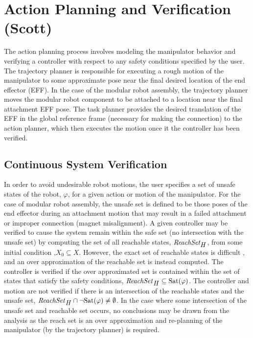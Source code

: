 \section{Action Planning and Verification (Scott)}

The action planning process involves modeling the manipulator behavior and verifying a controller with respect to any safety conditions specified by the user.
The trajectory planner is responsible for executing a rough motion of the manipulator to some approximate pose near the final desired location of the end effector (EFF).
In the case of the modular robot assembly, the trajectory planner moves the modular robot component to be attached to a location near the final attachment EFF pose.
The task planner provides the desired translation of the EFF in the global reference frame (necessary for making the connection) to the action planner, which then executes the motion once it the controller has been verified.


\subsection{Continuous System Verification}
In order to avoid undesirable robot motions, the user specifies a set of unsafe states of the robot, $\varphi$, for a given action or motion of the manipulator.
For the case of modular robot assembly, the unsafe set is defined to be those poses of the end effector during an attachment motion that may result in a failed attachment or improper connection (magnet misalignment).
A given controller may be verified to cause the system remain within the safe set (no intersection with the unsafe set) by computing the set of all reachable states, $\textit{ReachSet}_{\mbox{\textit{H}}}$, from some initial condition ,$X_0 \subseteq X$.
However, the exact set of reachable states is difficult \cite{Henzinger:1995:WDH:225058.225162}, and an over approximation of the reachable set is instead computed.
The controller is verified if the over approximated set is contained within the set of states that satisfy the safety conditions, $\mbox{\textit{ReachSet}}_{\mbox{\textit{H}}} \subseteq \mbox{Sat}(\varphi)$.
The controller and motion are not verified if there is an intersection of the reachable states and the unsafe set, $\mbox{\textit{ReachSet}}_{\mbox{\textit{H}}} \cap \neg \mbox{Sat}(\varphi) \neq \emptyset$.
In the case where some intersection of the unsafe set and reachable set occurs, no conclusions may be drawn from the analysis as the reach set is an over approximation and re-planning of the manipulator (by the trajectory planner) is required.

